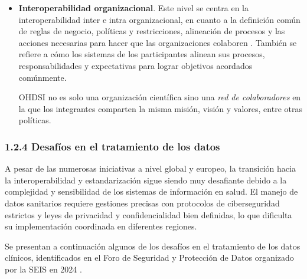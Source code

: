 \begin{itemize}
    \item \textbf{Interoperabilidad organizacional}. Este nivel se centra en la interoperabilidad inter e intra organizacional, en cuanto a la definición común de reglas de negocio, políticas y restricciones, alineación de procesos y las acciones necesarias para hacer que las organizaciones colaboren \cite{motta2019conceptual}. También se refiere a cómo los sistemas de los participantes alinean sus procesos, responsabilidades y expectativas para lograr objetivos acordados comúnmente.

    OHDSI no es solo una organización científica sino una \textit{red de colaboradores} en la que los integrantes comparten la misma misión, visión y valores, entre otras políticas.

\end{itemize}

\subsubsection{1.2.4 Desafíos en el tratamiento de los datos}


A pesar de las numerosas iniciativas a nivel global y europeo, la transición hacia la interoperabilidad y estandarización sigue siendo muy desafiante debido a la complejidad y sensibilidad de los sistemas de información en salud. El manejo de datos sanitarios requiere gestiones precisas con protocolos de ciberseguridad estrictos y leyes de privacidad y confidencialidad bien definidas, lo que dificulta su implementación coordinada en diferentes regiones.

Se presentan a continuación algunos de los desafíos en el tratamiento de los datos clínicos, identificados en el Foro de Seguridad y Protección de Datos organizado por la SEIS en 2024 \cite{SEIS2024tercera, SEIS2024octava}.


